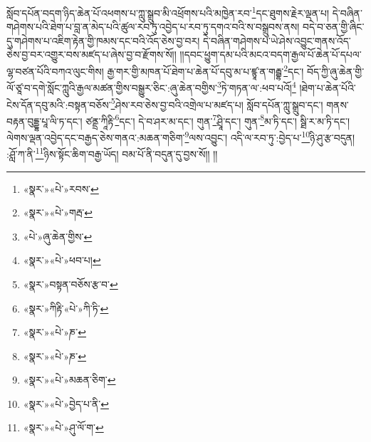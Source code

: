 སློབ་དཔོན་བདག་ཉིད་ཆེན་པོ་འཕགས་པ་ཀླུ་སྒྲུབ་མི་འཕྲོགས་པའི་མཁྱེན་རབ་\footnote{«སྣར་»«པེ་»རབས་}དང་ཐུགས་རྗེར་ལྡན་པ། དེ་བཞིན་གཤེགས་པའི་ཐེག་པ་བླ་ན་མེད་པའི་ཚུལ་རབ་ཏུ་འབྱེད་པ་རབ་ཏུ་དགའ་བའི་ས་བསྒྲུབས་ནས། བདེ་བ་ཅན་གྱི་ཞིང་དུ་གཤེགས་པ་འཇིག་རྟེན་གྱི་ཁམས་དང་བའི་འོད་ཅེས་བྱ་བར། དེ་བཞིན་གཤེགས་པ་ཡེ་ཤེས་འབྱུང་གནས་འོད་ཅེས་བྱ་བར་འགྱུར་བས་མཛད་པ་ཞེས་བྱ་བ་རྫོགས་སོ།། །།དབང་ཕྱུག་དམ་པའི་མངའ་བདག་རྒྱལ་པོ་ཆེན་པོ་དཔལ་ལྷ་བཙན་པོའི་བཀའ་ལུང་གིས། རྒྱ་གར་གྱི་མཁན་པོ་ཐེག་པ་ཆེན་པོ་དབུ་མ་པ་ཛྙཱ་ན་གརྦྷ་\footnote{«སྣར་»«པེ་»གརྦ་}དང་། བོད་ཀྱི་ཞུ་ཆེན་གྱི་ལོ་ཙཱ་བ་དགེ་སློང་ཀླུའི་རྒྱལ་མཚན་གྱིས་བསྒྱུར་ཅིང་:ཞུ་ཆེན་བགྱིས་\footnote{«པེ་»ཞུ་ཆེན་གྱིས་}ཏེ་གཏན་ལ་:ཕབ་པའོ།\footnote{«སྣར་»«པེ་»ཕབ་པ།} །ཐེག་པ་ཆེན་པོའི་ངེས་དོན་དབུ་མའི་:བསྟན་བཅོས་\footnote{«སྣར་»བསྟན་བཅོས་རྩ་བ་}ཤེས་རབ་ཅེས་བྱ་བའི་འགྲེལ་པ་མཛད་པ། སློབ་དཔོན་ཀླུ་སྒྲུབ་དང་། གནས་བརྟན་བུདྡྷ་པཱ་ལི་ཏ་དང་། ཙནྡྲ་ཀཱིརྟི་\footnote{«སྣར་»ཀིརྟི་«པེ་»ཀི་ཏི་}དང་། དེ་བ་ཤར་མ་དང་། གུན་\footnote{«སྣར་»«པེ་»ཎ་}ཤྲཱི་དང་། གུན་\footnote{«སྣར་»«པེ་»ཎ་}མ་ཏི་དང་། སྠི་ར་མ་ཏི་དང་། ལེགས་ལྡན་འབྱེད་དང་བརྒྱད་ཅེས་གནའ་:མཆན་གཅིག་\footnote{«སྣར་»«པེ་»མཆན་ཅིག་}ལས་འབྱུང་། འདི་ལ་རབ་ཏུ་:བྱེད་པ་\footnote{«སྣར་»«པེ་»བྱེད་པ་ནི་}ཉི་ཤུ་རྩ་བདུན། :ཤློ་ཀ་ནི་\footnote{«སྣར་»«པེ་»ཤུ་ལོ་ག་}ཉིས་སྟོང་ཆིག་བརྒྱ་ཡོད། བམ་པོ་ནི་བདུན་དུ་བྱས་སོ།། །།